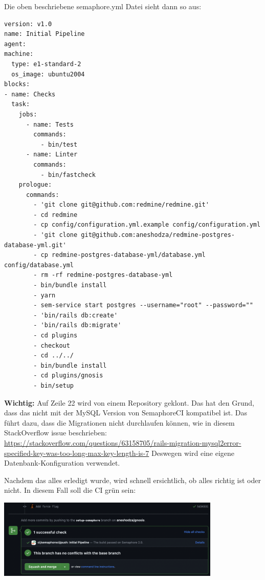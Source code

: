 Die oben beschriebene semaphore.yml Datei sieht dann so aus:
\begin{codebox}[]
  \begin{verbatim}
version: v1.0
name: Initial Pipeline
agent:
machine:
  type: e1-standard-2
  os_image: ubuntu2004
blocks:
- name: Checks
  task:
    jobs:
      - name: Tests
        commands:
          - bin/test
      - name: Linter
        commands:
          - bin/fastcheck
    prologue:
      commands:
        - 'git clone git@github.com:redmine/redmine.git'
        - cd redmine
        - cp config/configuration.yml.example config/configuration.yml
        - 'git clone git@github.com:aneshodza/redmine-postgres-database-yml.git'
        - cp redmine-postgres-database-yml/database.yml config/database.yml
        - rm -rf redmine-postgres-database-yml
        - bin/bundle install
        - yarn
        - sem-service start postgres --username="root" --password=""
        - 'bin/rails db:create'
        - 'bin/rails db:migrate'
        - cd plugins
        - checkout
        - cd ../../
        - bin/bundle install
        - cd plugins/gnosis
        - bin/setup
  \end{verbatim}
\end{codebox}
\textbf{Wichtig:} Auf Zeile 22 wird von einem Repository geklont. Das hat den Grund, dass das
 nicht mit der MySQL Version von SemaphoreCI kompatibel ist. Das führt dazu,
dass die Migrationen nicht durchlaufen können, wie in diesem StackOverflow issue beschrieben: \newline
\url{https://stackoverflow.com/questions/63158705/rails-migration-mysql2error-specified-key-was-too-long-max-key-length-is-7}
\newline
Deswegen wird eine eigene Datenbank-Konfiguration verwendet.

Nachdem das alles erledigt wurde, wird schnell ersichtlich, ob alles richtig ist oder nicht. In diesem Fall soll die CI
grün sein: \newline
\begin{center}
  \includegraphics[width=0.8\textwidth]{images/misc/ci-passed.png}
  \label{fig:semaphore_ci_passed}
  \newline
\end{center}

